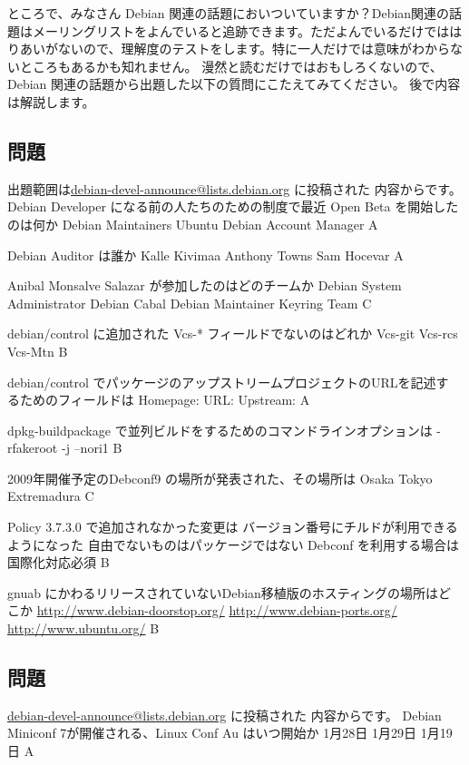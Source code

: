 \documentclass[mingoth,a4paper]{jsarticle}
\begin{document}
ところで、みなさん Debian 関連の話題においついていますか？Debian関連の話
題はメーリングリストをよんでいると追跡できます。ただよんでいるだけではは
りあいがないので、理解度のテストをします。特に一人だけでは意味がわからな
いところもあるかも知れません。
漫然と読むだけではおもしろくないので、Debian 関連の話題から出題した以下の質問にこたえてみてください。
後で内容は解説します。
\begin{multicols}{2}

\subsection{問題}
出題範囲は\url{debian-devel-announce@lists.debian.org} に投稿された
内容からです。
 \santaku
 {Debian Developer になる前の人たちのための制度で最近 Open Beta を開始したのは何か}
 {Debian Maintainers}
 {Ubuntu}
 {Debian Account Manager}
 {A}

 \santaku
 {Debian Auditor は誰か}
 {Kalle Kivimaa}
 {Anthony Towns}
 {Sam Hocevar}
 {A}

 \santaku
 {Anibal Monsalve Salazar が参加したのはどのチームか}
 {Debian System Administrator}
 {Debian Cabal}
 {Debian Maintainer Keyring Team}
 {C}

 \santaku
 {debian/control に追加された Vcs-* フィールドでないのはどれか}
 {Vcs-git}
 {Vcs-rcs}
 {Vcs-Mtn}
 {B}

 \santaku
 {debian/control でパッケージのアップストリームプロジェクトのURLを記述す
 るためのフィールドは}
 {Homepage:}
 {URL:}
 {Upstream:}
 {A}

 \santaku
 {dpkg-buildpackage で並列ビルドをするためのコマンドラインオプションは}
 {-rfakeroot}
 {-j}
 {--nori1}
 {B}

 \santaku
 {2009年開催予定のDebconf9 の場所が発表された、その場所は}
 {Osaka}
 {Tokyo}
 {Extremadura}
 {C}

 \santaku
 {Policy 3.7.3.0 で追加されなかった変更は}
 {バージョン番号にチルドが利用できるようになった}
 {自由でないものはパッケージではない}
 {Debconf を利用する場合は国際化対応必須}
 {B}

 \santaku
 {gnuab にかわるリリースされていないDebian移植版のホスティングの場所はど
 こか}
 {\url{http://www.debian-doorstop.org/}}
 {\url{http://www.debian-ports.org/}}
 {\url{http://www.ubuntu.org/}}
 {B}

\subsection{問題}
\url{debian-devel-announce@lists.debian.org} に投稿された
内容からです。
 \santaku
 {Debian Miniconf 7が開催される、Linux Conf Au はいつ開始か}
 {1月28日}
 {1月29日}
 {1月19日}
 {A}


\end{multicols}
\end{document}
